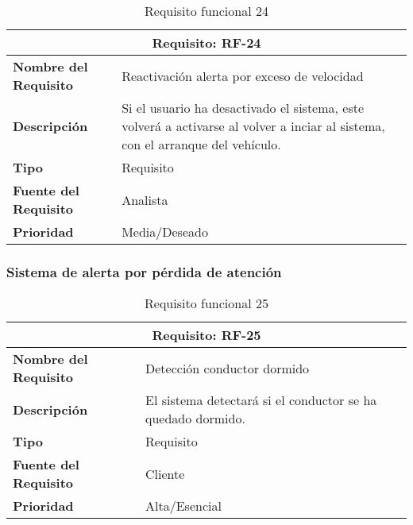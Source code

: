 \begin{table}[H]
\begin{center}
\begin{tabular}{p{} p{7cm}}
\multicolumn{2}{c}{\textbf{Requisito: RF-24} } \\
\hline \hline
\textbf{Nombre del Requisito} & Reactivación alerta por exceso de  velocidad \\
\hline
\textbf{Descripción} & Si el usuario ha desactivado el sistema, este volverá a activarse al volver a inciar al sistema, con el arranque del vehículo. \\
\hline
\textbf{Tipo} & Requisito  \\
\hline
\textbf{Fuente del Requisito} & Analista  \\
\hline
\textbf{Prioridad} & Media/Deseado  \\ \hline
\end{tabular}
\caption{Requisito funcional 24}
\label{tab:RF-24}
\end{center}
\end{table}

\clearpage
\subsubsection{Sistema de alerta por pérdida de atención}

\begin{table}[H]
\begin{center}
\begin{tabular}{p{} p{7cm}}
\multicolumn{2}{c}{\textbf{Requisito: RF-25} } \\
\hline \hline
\textbf{Nombre del Requisito} & Detección conductor dormido\\
\hline
\textbf{Descripción} & El sistema detectará si el conductor se ha quedado dormido.\\
\hline
\textbf{Tipo} & Requisito  \\
\hline
\textbf{Fuente del Requisito} & Cliente  \\
\hline
\textbf{Prioridad} & Alta/Esencial  \\ \hline
\end{tabular}
\caption{Requisito funcional 25}
\label{tab:RF-25}
\end{center}
\end{table}



